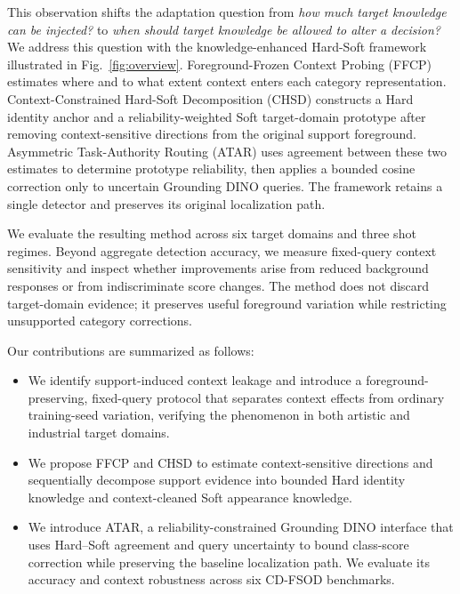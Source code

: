 This observation shifts the adaptation question from \emph{how much target knowledge can be injected?} to \emph{when should target knowledge be allowed to alter a decision?} We address this question with the knowledge-enhanced Hard-Soft framework illustrated in Fig.~\ref{fig:overview}. Foreground-Frozen Context Probing (FFCP) estimates where and to what extent context enters each category representation. Context-Constrained Hard-Soft Decomposition (CHSD) constructs a Hard identity anchor and a reliability-weighted Soft target-domain prototype after removing context-sensitive directions from the original support foreground. Asymmetric Task-Authority Routing (ATAR) uses agreement between these two estimates to determine prototype reliability, then applies a bounded cosine correction only to uncertain Grounding DINO queries. The framework retains a single detector and preserves its original localization path.

We evaluate the resulting method across six target domains and three shot regimes. Beyond aggregate detection accuracy, we measure fixed-query context sensitivity and inspect whether improvements arise from reduced background responses or from indiscriminate score changes. The method does not discard target-domain evidence; it preserves useful foreground variation while restricting unsupported category corrections.

Our contributions are summarized as follows:
\begin{itemize}
    \item We identify support-induced context leakage and introduce a foreground-preserving, fixed-query protocol that separates context effects from ordinary training-seed variation, verifying the phenomenon in both artistic and industrial target domains.
    \item We propose FFCP and CHSD to estimate context-sensitive directions and sequentially decompose support evidence into bounded Hard identity knowledge and context-cleaned Soft appearance knowledge.
    \item We introduce ATAR, a reliability-constrained Grounding DINO interface that uses Hard--Soft agreement and query uncertainty to bound class-score correction while preserving the baseline localization path. We evaluate its accuracy and context robustness across six CD-FSOD benchmarks.
\end{itemize}
